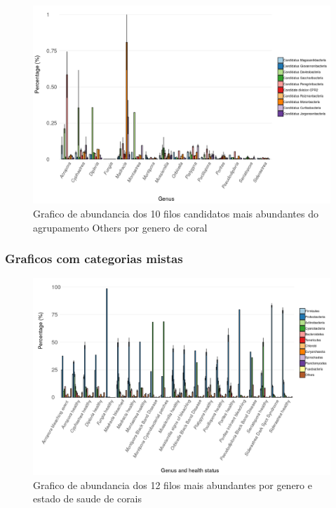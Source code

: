 \documentclass[12pt, a4paper]{report}
\begin{document}
\begin{figure}[H]
	\centering
	\includegraphics[scale=0.4]{figures/barplot_coral_genus_10_most_abundant_candidate_1_fevereiro_2019_edited.png}
	\caption{Grafico de abundancia dos 10 filos candidatos mais abundantes do agrupamento Others por genero de coral}
	\label{fig: barplotcoralgenus12mostabundantofothers1fevereiro2019}
\end{figure}

\subsubsection{Graficos com categorias mistas}


\begin{figure}[H]
	\centering
	\includegraphics[scale=0.4]{figures/barplot_coral_genus&health_status_12_most_abundant_31_janeiro_2019_edited.png}
	\caption{Grafico de abundancia dos 12 filos mais abundantes por genero e estado de saude de corais}
	\label{fig: barplotcoralgenus&health12mostabundant1fevereiro2019}
\end{figure}
\end{document}
